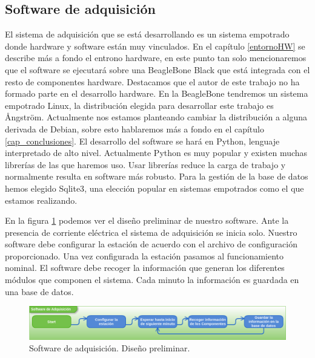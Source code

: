 	\subsection{Software de adquisición}
		El sistema de adquisición que se está desarrollando es un sistema empotrado donde hardware y software están muy vinculados. En el
		capítulo \ref{entornoHW} se describe más a fondo el entrono hardware, en este punto tan solo mencionaremos que el software se
		ejecutará sobre una BeagleBone Black\cite{Beagle} que está integrada con el resto de componentes hardware. Destacamos que el autor de
		este trabajo no ha formado parte en el desarrollo hardware. En la BeagleBone tendremos un sistema empotrado Linux, la distribución
		elegida para desarrollar este trabajo es Ångström. Actualmente nos estamos planteando cambiar la distribución a alguna derivada de
		Debian, sobre esto hablaremos más a fondo en el capítulo \ref{cap_conclusiones}. El desarrollo del software se hará en
		Python\cite{Python}, lenguaje interpretado de alto nivel. Actualmente Python es muy popular y existen muchas librerías de las que
		haremos uso. Usar librerías reduce la carga de trabajo y normalmente resulta en software más robusto. Para la gestión de la base de
		datos hemos elegido Sqlite3\cite{Sqlite}, una elección popular en sistemas empotrados como el que estamos realizando. 
		\par
		En la figura \ref{fig:soft_control_preliminar} podemos ver el diseño preliminar de nuestro software. Ante la presencia de corriente
		eléctrica el sistema de adquisición se inicia solo. Nuestro software debe configurar la estación de acuerdo con el archivo de
		configuración proporcionado. Una vez configurada la estación pasamos al funcionamiento nominal. El software debe recoger la
		información que generan los diferentes módulos que componen el sistema. Cada minuto la información es guardada en una base de datos.
		\begin{figure}[h]
			\centering
			\includegraphics[keepaspectratio, width=1\textwidth]{./img/soft_control_preliminar.png}
			\caption{Software de adquisición. Diseño preliminar.}
			\label{fig:soft_control_preliminar}
		\end{figure}
